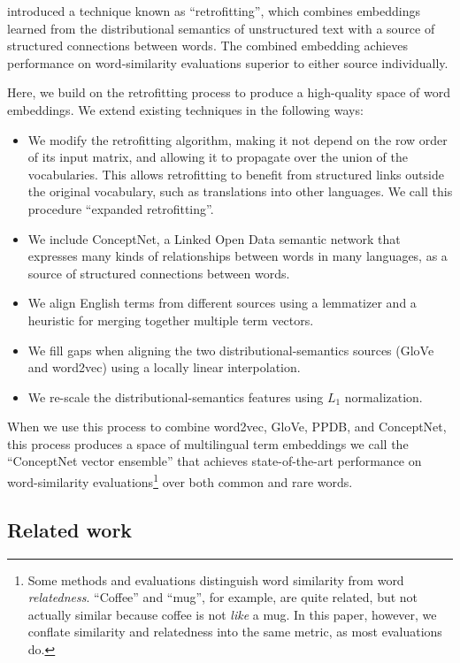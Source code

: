 \documentclass[11pt,letterpaper]{article}
\begin{document}
 introduced a technique
known as ``retrofitting'', which combines embeddings learned from the
distributional semantics of unstructured text with a source of structured
connections between words. The combined embedding achieves performance on
word-similarity evaluations superior to either source individually.

Here, we build on the retrofitting process to produce a high-quality space of
word embeddings. We extend existing techniques in the following ways:

\begin{itemize}
\item We modify the retrofitting algorithm, making it not depend on the row
order of its input matrix, and allowing it to propagate over the union of the
vocabularies. This allows retrofitting to benefit from structured links outside
the original vocabulary, such as translations into other languages.
We call this procedure ``expanded retrofitting''.
\item We include ConceptNet, a Linked Open Data semantic network that expresses
many kinds of relationships between words in many languages, as a source of
structured connections between words.
\item We align English terms from different sources using a lemmatizer and a
heuristic for merging together multiple term vectors.
\item We fill gaps when aligning the two distributional-semantics sources
(GloVe and word2vec) using a locally linear interpolation.
\item We re-scale the distributional-semantics features using $L_1$ normalization.
\end{itemize}

When we use this process to combine word2vec, GloVe, PPDB, and ConceptNet, this
process produces a space of multilingual term embeddings we call the
``ConceptNet vector ensemble'' that achieves state-of-the-art performance on
word-similarity evaluations\footnote{Some methods and evaluations
\cite{agirre2009similarity} distinguish word similarity from word {\em
relatedness}. ``Coffee'' and ``mug'', for example, are quite related, but
not actually similar because coffee is not {\em like} a mug. In this paper,
however, we conflate similarity and relatedness into the same metric, as most
evaluations do.} over both common and rare words.


\subsection{Related work}
\end{document}
